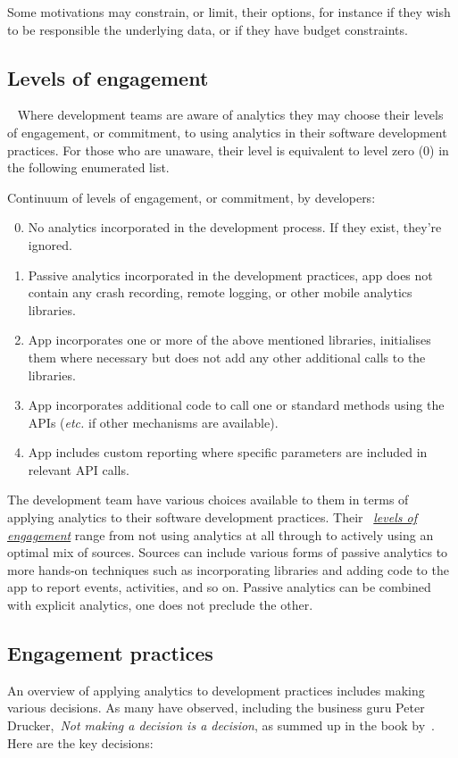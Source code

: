 Some motivations may constrain, or limit, their options, for instance if they wish to be responsible the underlying data, or if they have budget constraints.

\subsection{Levels of engagement}~\label{subsection-levels-of-engagement}
Where development teams are aware of analytics they may choose their levels of engagement, or commitment, to using analytics in their software development practices. For those who are unaware, their level is equivalent to level zero (0) in the following enumerated list. 

Continuum of levels of engagement, or commitment, by developers:
\begin{enumerate}
    \setcounter{enumi}{-1} %
    \item No analytics incorporated in the development process. If they exist, they're ignored.
    \item Passive analytics incorporated in the development practices, app does not contain any crash recording, remote logging, or other mobile analytics libraries.
    \item App incorporates one or more of the above mentioned libraries, initialises them where necessary but does not add any other additional calls to the libraries.
    \item App incorporates additional code to call one or standard methods using the APIs (\emph{etc.} if other mechanisms are available).
    \item App includes custom reporting where specific parameters are included in relevant API calls.
\end{enumerate}

The development team have various choices available to them in terms of applying analytics to their software development practices. Their ~\href{subsection-levels-of-engagement}{\emph{levels of engagement}} range from not using analytics at all through to actively using an optimal mix of sources. 
Sources can include various forms of passive analytics to more hands-on techniques such as incorporating libraries and adding code to the app to report events, activities, and so on. 
Passive analytics can be combined with explicit analytics, one does not preclude the other.

\subsection{Engagement practices}
An overview of applying analytics to development practices includes making various decisions. As many have observed, including the business guru Peter Drucker,~\emph{Not making a decision is a decision}, as summed up in the book by~\cite{gunther2013truth_about_better_decision_making}. %
Here are the key decisions:

